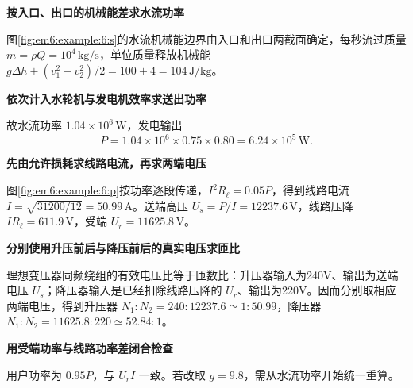 \begin{solution}\textbf{按入口、出口的机械能差求水流功率}\par\nobreak
图\ref{fig:em6:example:6:s}的水流机械能边界由入口和出口两截面确定，每秒流过质量 $\dot m=\rho Q=10^4\,\mathrm{kg/s}$，单位质量释放机械能 $g\Delta h+(v_1^2-v_2^2)/2=100+4=104\,\mathrm{J/kg}$。

\par\medskip{}\noindent\textbf{依次计入水轮机与发电机效率求送出功率}\par\nobreak
故水流功率 $1.04\times10^6\,\mathrm W$，发电输出
\[P=1.04\times10^6\times0.75\times0.80=6.24\times10^5\,\mathrm W.\]



\par\medskip{}\noindent\textbf{先由允许损耗求线路电流，再求两端电压}\par\nobreak
图\ref{fig:em6:example:6:p}按功率逐段传递，$I^2R_\ell=0.05P$，得到线路电流 $I=\sqrt{31200/12}=50.99\,\mathrm A$。送端高压 $U_s=P/I=12237.6\,\mathrm V$，线路压降 $IR_\ell=611.9\,\mathrm V$，受端 $U_r=11625.8\,\mathrm V$。

\par\medskip{}\noindent\textbf{分别使用升压前后与降压前后的真实电压求匝比}\par\nobreak
理想变压器同频绕组的有效电压比等于匝数比：升压器输入为240V、输出为送端电压 $U_s$；降压器输入是已经扣除线路压降的 $U_r$、输出为220V。因而分别取相应两端电压，得到升压器 $N_1:N_2=240:12237.6\simeq1:50.99$，降压器 $N_1:N_2=11625.8:220\simeq52.84:1$。

\par\medskip{}\noindent\textbf{用受端功率与线路功率差闭合检查}\par\nobreak
用户功率为 $0.95P$，与 $U_rI$ 一致。若改取 $g=9.8$，需从水流功率开始统一重算。\end{solution}
